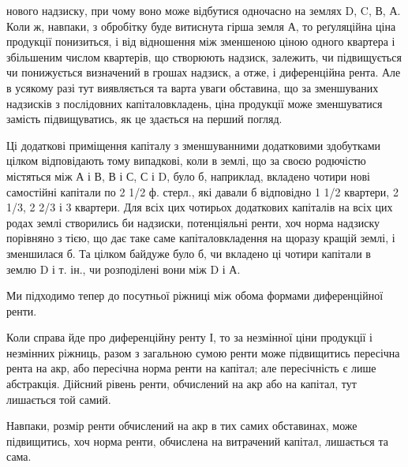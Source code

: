 нового надзиску, при чому воно може відбутися одночасно на землях D, C, В, А.
Коли ж, навпаки, з обробітку буде витиснута гірша земля А, то реґуляційна
ціна продукції понизиться, і від відношення між зменшеною ціною одного
квартера і збільшеним числом квартерів, що створюють надзиск, залежить, чи
підвищується чи понижується визначений в грошах надзиск, а отже, і диференційна
рента. Але в усякому разі тут виявляється та варта уваги обставина,
що за зменшуваних надзисків з послідовних капіталовкладень, ціна продукції
може зменшуватися замість підвищуватись, як це здається на перший погляд.

Ці додаткові приміщення капіталу з зменшуванними додатковими здобутками
цілком відповідають тому випадкові, коли в землі, що за своєю родючістю
містяться між А і В, В і С, С і D, було б, наприклад, вкладено чотири нові
самостійні капітали по 2 1/2 ф. стерл., які давали б відповідно 1 1/2 квартери,
2 1/3, 2 2/3 і 3 квартери. Для всіх цих чотирьох додаткових капіталів на всіх
цих родах землі створились би надзиски, потенціяльні ренти, хоч норма надзиску
порівняно з тією, що дає таке саме капіталовкладення на щоразу кращій землі,
і зменшилася б. Та цілком байдуже було б, чи вкладено ці чотири капітали
в землю D і т. ін., чи розподілені вони між D і А.

Ми підходимо тепер до посутньої ріжниці між обома формами диференційної
ренти.

Коли справа йде про диференційну ренту І, то за незмінної ціни продукції
і незмінних ріжниць, разом з загальною сумою ренти може підвищитись
пересічна рента на акр, або пересічна норма ренти на капітал; але пересічність
є лише абстракція. Дійсний рівень ренти, обчислений на акр або на капітал,
тут лишається той самий.

Навпаки, розмір ренти обчислений на акр в тих самих обставинах, може
підвищитись, хоч норма ренти, обчислена на витрачений капітал, лишається
та сама.

